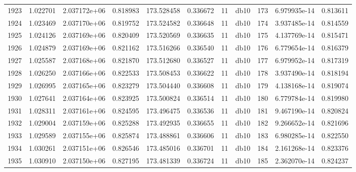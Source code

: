 \begin{tabular}{lrrrrrrlrrr}
1923 &    1.022701 &        2.037172e+06 &  0.818983 &              173.528458 &    0.336672 &      11 &         db10 &    173 &   6.979935e-14 &      0.813611 \\
1924 &    1.023469 &        2.037170e+06 &  0.819752 &              173.524582 &    0.336648 &      11 &         db10 &    174 &   3.937485e-14 &      0.814559 \\
1925 &    1.024126 &        2.037169e+06 &  0.820409 &              173.520569 &    0.336635 &      11 &         db10 &    175 &   4.137769e-14 &      0.815471 \\
1926 &    1.024879 &        2.037169e+06 &  0.821162 &              173.516266 &    0.336540 &      11 &         db10 &    176 &   6.779654e-14 &      0.816379 \\
1927 &    1.025587 &        2.037168e+06 &  0.821870 &              173.512680 &    0.336527 &      11 &         db10 &    177 &   6.979952e-14 &      0.817319 \\
1928 &    1.026250 &        2.037166e+06 &  0.822533 &              173.508453 &    0.336622 &      11 &         db10 &    178 &   3.937490e-14 &      0.818194 \\
1929 &    1.026995 &        2.037165e+06 &  0.823279 &              173.504440 &    0.336608 &      11 &         db10 &    179 &   4.138168e-14 &      0.819074 \\
1930 &    1.027641 &        2.037164e+06 &  0.823925 &              173.500824 &    0.336514 &      11 &         db10 &    180 &   6.779784e-14 &      0.819980 \\
1931 &    1.028311 &        2.037161e+06 &  0.824595 &              173.496475 &    0.336536 &      11 &         db10 &    181 &   9.467190e-14 &      0.820824 \\
1932 &    1.029004 &        2.037159e+06 &  0.825288 &              173.492935 &    0.336655 &      11 &         db10 &    182 &   9.266652e-14 &      0.821696 \\
1933 &    1.029589 &        2.037155e+06 &  0.825874 &              173.488861 &    0.336606 &      11 &         db10 &    183 &   6.980285e-14 &      0.822550 \\
1934 &    1.030261 &        2.037151e+06 &  0.826546 &              173.485016 &    0.336701 &      11 &         db10 &    184 &   2.161268e-14 &      0.823376 \\
1935 &    1.030910 &        2.037150e+06 &  0.827195 &              173.481339 &    0.336724 &      11 &         db10 &    185 &   2.362070e-14 &      0.824237 \\

\end{tabular}
